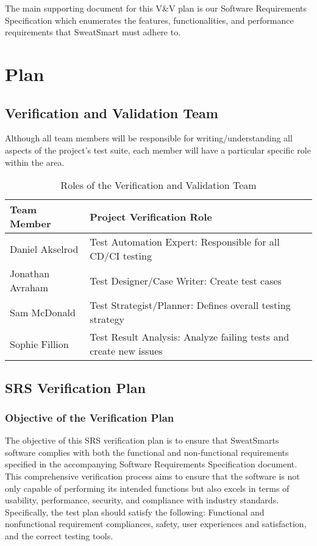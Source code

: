 \documentclass[12pt, titlepage]{article}
\begin{document}
    The main supporting document for this V\&V plan is our Software Requirements Specification which enumerates the features, functionalities, and performance requirements that SweatSmart must adhere to.


    \section{Plan}

    \subsection{Verification and Validation Team}

    Although all team members will be responsible for writing/understanding all aspects of the project's test suite, each member will have a particular specific role within the area.

    \begin{table}[h]
        \centering
        \begin{tabular}{|l|l|}
            \hline
            \textbf{Team Member} & \textbf{Project Verification Role} \\
            \hline
            Daniel Akselrod & Test Automation Expert: Responsible for all CD/CI testing \\
            \hline
            Jonathan Avraham & Test Designer/Case Writer: Create test cases \\
            \hline
            Sam McDonald & Test Strategist/Planner: Defines overall testing strategy \\
            \hline
            Sophie Fillion & Test Result Analysis: Analyze failing tests and create new issues \\
            \hline
        \end{tabular}
        \caption{Roles of the Verification and Validation Team}
        \label{tab:verification_validation_team}
    \end{table}

    \subsection{SRS Verification Plan}

    \subsubsection{Objective of the Verification Plan}
    The objective of this SRS verification plan is to ensure that SweatSmarts software complies with both the functional and non-functional requirements specified in the accompanying Software Requirements Specification document. This comprehensive verification process aims to ensure that the software is not only capable of performing its intended functions but also excels in terms of usability, performance, security, and compliance with industry standards. Specifically, the test plan should satisfy the following: Functional and nonfunctional requirement compliances, safety, user experiences and satisfaction, and the correct testing tools.
\end{document}
